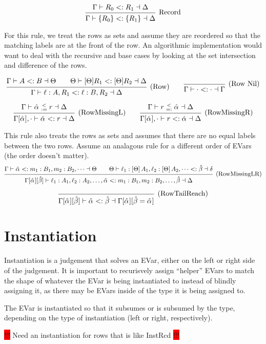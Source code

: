 \documentclass{article}
\newcommand{\consider}[1]{\colorbox{red}{!!!} #1 \colorbox{red}{!!!}}
\newcommand{\subsume}{<:}
\newcommand{\instLSymbol}{\;\substack{<\\:=}\;}
\newcommand{\instRSymbol}{\;\substack{<\\=:}\;}
\newcommand{\ev}{\hat}
\newcommand{\spc}{\qquad}
\newcommand{\apply}[1]{\left[#1\right]}
\newcommand{\eva}[1][]{\ev \alpha_{#1}}
\newcommand{\evb}{\ev \beta}
\newcommand{\subsumes}[4]{#1 \vdash #2 \subsume #3 \dashv #4}
\newcommand{\instL}[4]{#1 \vdash #2 \instLSymbol #3 \dashv #4}
\newcommand{\instR}[4]{#1 \vdash #2 \instRSymbol #3 \dashv #4}
\newcommand{\deduct}[3][]
{
  \begin{prooftree}
    \hypo{#2}
    \infer1[\text{#1}]{#3}
  \end{prooftree}
}
\begin{document}
\[
  \deduct[Record]{\subsumes{\Gamma}{R_0}{R_1}{\Delta}}{\subsumes{\Gamma}{\{R_0\}}{\{R_1\}}{\Delta}}
\]

For this rule, we treat the rows as sets and assume they are reordered so that
the matching labels are at the front of the row. An algorithmic implementation
would want to deal with the recursive and base cases by looking at the set
intersection and difference of the rows.

\[
  \deduct[(Row)]
  {\subsumes{\Gamma}{A}{B}{\Theta}
    \spc
    \subsumes{\Theta}{[\Theta] R_1}{[\Theta] R_2}{\Delta}
  }
  { \subsumes{\Gamma}{\ell : A, R_1}{\ell : B, R_2}{\Delta} }
  \spc
  \deduct[(Row Nil)]{}{ \subsumes{\Gamma}{\cdot}{\cdot}{\Gamma} }
\]

\[
  \deduct[(RowMissingL)]
  {\instL{\Gamma}{\eva}{r}{\Delta}}
  {\subsumes{\Gamma[\eva], \cdot}{\eva}{r}{\Delta}}
  \spc
  \deduct[(RowMissingR)]
  {\instR{\Gamma}{r}{\eva}{\Delta}}
  {\subsumes{\Gamma[\eva], \cdot}{r}{\eva}{\Delta}}
\]

This rule also treats the rows as sets and assumes that there are no equal
labels between the two rows. Assume an analagous rule for a different order of
EVars (the order doesn't matter).
\[
  \deduct[(RowMissingLR)]
  {\subsumes{\Gamma}{\eva}{m_1 : B_1, m_2 : B_2, \dots}{\Theta} \spc
    \subsumes{\Theta}{\ell_1 : \apply\Theta A_1, \ell_2 : \apply\Theta A_2,
      \dots}{\evb}{\delta}}
  {\subsumes{\Gamma[\eva][\evb]}{\ell_1 : A_1, \ell_2 : A_2, \dots, \eva}{m_1 :
      B_1, m_2 : B_2, \dots, \evb}{\Delta}}
\]

\[
  \deduct[(RowTailReach)]
  {}
  {\subsumes{\Gamma[\eva][\evb]}{\eva}{\evb}{\Gamma[\eva][\evb=\eva]}}
\]


\section{Instantiation}

Instantiation is a judgement that solves an EVar, either on the left or right
side of the judgement. It is important to recurisvely assign ``helper'' EVars to
match the shape of whatever the EVar is being instantiated to instead of blindly
assigning it, as there may be EVars inside of the type it is being assigned to.

The EVar is instantiated so that it subsumes or is subsumed by the type,
depending on the type of instantiation (left or right, respectively).

\consider{Need an instantiation for rows that is like InstRcd}
\end{document}
